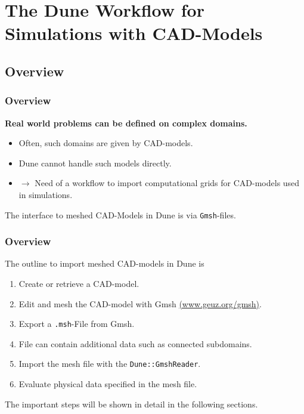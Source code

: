 \section{The Dune Workflow for Simulations with CAD-Models}\label{Sec:Workflow}

\subsection{Overview}

\begin{frame}
  \frametitle<presentation>{Overview}
  \textbf{Real world problems can be defined on complex domains.}
  \begin{itemize}
    \item Often, such domains are given by CAD-models.
    \item Dune cannot handle such models directly.
    \item $\rightarrow$ Need of a workflow to import computational grids
      for CAD-models used in simulations.
  \end{itemize}
  The interface to meshed CAD-Models in Dune is via \lstinline!Gmsh!-files.
\end{frame}

\begin{frame}
  \frametitle<presentation>{Overview}
  The outline to import meshed CAD-models in Dune is
  \begin{enumerate}
    \item Create or retrieve a CAD-model.
    \item Edit and mesh the CAD-model with Gmsh
      \href{http://www.geuz.org/msh}{(www.geuz.org/gmsh)}.
    \item Export a \lstinline!.msh!-File from Gmsh.
    \item File can contain additional data such as connected subdomains.
    \item Import the mesh file with the \lstinline!Dune::GmshReader!.
    \item Evaluate physical data specified in the mesh file.
  \end{enumerate}
  The important steps will be shown in detail in the following sections.
\end{frame}


